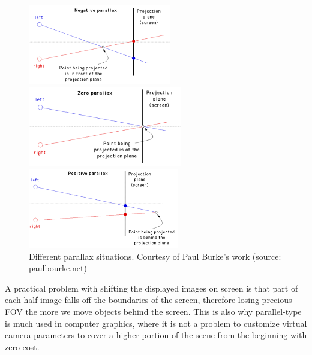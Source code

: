 \begin{figure}
\centering
\begin{subfigure}    
\begin{minipage}[t]{0.32\textwidth}
\includegraphics[width=\linewidth, height=3.5cm]{schemas/negative_parallax}
\end{minipage}
\hspace{\fill}
\begin{minipage}[t]{0.32\textwidth}
\includegraphics[width=\linewidth, height=3.5cm]{schemas/zero_parallax}
\end{minipage}
\hspace{\fill}
\begin{minipage}[t]{0.32\textwidth}
\includegraphics[width=\linewidth, height=3.5cm]{schemas/positive_parallax}
\end{minipage}
\end{subfigure}
\vspace*{-5mm}
\caption{Different parallax situations. Courtesy of Paul Burke's work (source: \href{http://paulbourke.net/stereographics/stereorender/}{paulbourke.net})}
\label{fig:parallax_plane}
\end{figure}

A practical problem with shifting the displayed images on screen is that part of each half-image falls off the boundaries of the screen, therefore losing precious FOV the more we move objects behind the screen. This is also why parallel-type is much used in computer graphics, where it is not a problem to customize virtual camera parameters to cover a higher portion of the scene from the beginning with zero cost.


